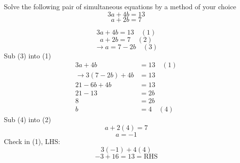\question Solve the following pair of simultaneous equations by a method of 
your choice
\[
	3a + 4b = 13
\]
\[
	a + 2b = 7
\]
\begin{solution}
	\[
		3a + 4b = 13 
		\quad (1)
	\]
	\[
		a + 2b = 7 
		\quad (2)
	\]
	\[
		\rightarrow
		a = 7-2b
		\quad (3)
	\]
	Sub (3) into (1)
	\noindent
	\begin{align*}
		3a + 4b 
			&= 13 
			\quad (1)
			\\
		\rightarrow 
		3(7-2b) + 4b 
			&= 13 
			\\
		21 - 6b + 4b 
			&= 13 
			\\
		21 - 13 
			&= 2b
			\\
		8
			&= 2b
			\\
		b
			&= 4 
			\quad (4)
	\end{align*}
	Sub (4) into (2)
	\[
		a + 2(4) = 7
	\]
	\[
		a = -1
	\]
	Check in (1), LHS:
	\[
		3(-1) + 4(4)
	\]
	\[
		-3 + 16 = 13 = \text{RHS}
	\]
\end{solution}

